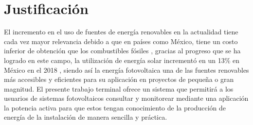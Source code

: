 \section{Justificación}
El incremento en el uso de fuentes de energía renovables en la actualidad tiene cada vez mayor relevancia debido a que en países como México, tiene un costo inferior de obtención que los combustibles fósiles \citep{Not1}, gracias al progreso que se ha logrado en este campo, la utilización de energía solar incrementó en un 13\% en México en el 2018 \citep{Not2}, siendo así la energía fotovoltaica una de las fuentes renovables más accesibles y eficientes para su aplicación en proyectos de pequeña o gran magnitud.
El presente trabajo terminal ofrece un sistema que permitirá a los usuarios de sistemas fotovoltaicos consultar y monitorear mediante una aplicación la potencia activa para que estos tengan conocimiento de la producción de energía de la instalación de manera sencilla y práctica.
